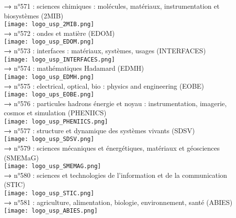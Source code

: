 \documentclass[french,12pt,a4paper]{book}
\begin{document}
\noindent \textbf{\color{Prune}→} n°571 : sciences chimiques : molécules, matériaux, instrumentation et biosystèmes (2MIB)\\
\texttt{[image: logo\_usp\_2MIB.png]}\\

\noindent \textbf{\color{Prune}→} n°572 : ondes et matière (EDOM)\\
\texttt{[image: logo\_usp\_EDOM.png]}\\
\newpage
\noindent \textbf{\color{Prune}→} n°573 : interfaces : matériaux, systèmes, usages (INTERFACES)\\
\texttt{[image: logo\_usp\_INTERFACES.png]}\\

\noindent \textbf{\color{Prune}→} n°574 : mathématiques Hadamard (EDMH)\\
\texttt{[image: logo\_usp\_EDMH.png]}\\

\noindent \textbf{\color{Prune}→} n°575 : electrical, optical, bio : physics and engineering  (EOBE)\\
\texttt{[image: logo\_ups\_EOBE.png]}\\

\noindent \textbf{\color{Prune}→} n°576 : particules hadrons énergie et noyau : instrumentation, imagerie, cosmos et simulation (PHENIICS)\\
\texttt{[image: logo\_usp\_PHENIICS.png]}\\

\noindent \textbf{\color{Prune}→} n°577 : structure et dynamique des systèmes vivants (SDSV)\\
\texttt{[image: logo\_usp\_SDSV.png]}\\

\noindent \textbf{\color{Prune}→} n°579 : sciences mécaniques et énergétiques, matériaux et géosciences  (SMEMaG)\\
\texttt{[image: logo\_usp\_SMEMAG.png]}\\
\newpage
\noindent \textbf{\color{Prune}→} n°580 : sciences et technologies de l'information et de la communication (STIC)\\
\texttt{[image: logo\_usp\_STIC.png]}\\

\noindent \textbf{\color{Prune}→} n°581 : agriculture, alimentation, biologie, environnement, santé (ABIES)\\
\texttt{[image: logo\_usp\_ABIES.png]}\\
\end{document}
